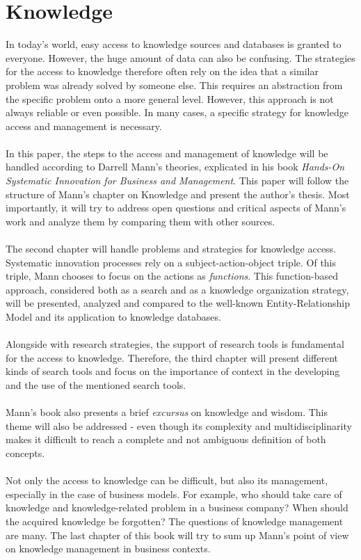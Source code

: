 \chapter{Knowledge}
In today's world, easy access to knowledge sources and databases is granted to everyone. However, the huge amount of data can also be confusing. The strategies for the access to knowledge therefore often rely on the idea that a similar problem was already solved by someone else. This requires an abstraction from the specific problem onto a more general level. However, this approach is not always reliable or even possible. In many cases, a specific strategy for knowledge access and management is necessary.\\ \\  In this paper, the steps to the access and management of knowledge will be handled according to Darrell Mann's theories, explicated in his book \textit{Hands-On Systematic Innovation for Business and Management}. \cite{darrell2004hands}
This paper will follow the structure of Mann's chapter on Knowledge and present the author's thesis. Most importantly, it will try to address open questions and critical aspects of Mann's work and analyze them by comparing them with other sources.\\
\\
The second chapter will handle problems and strategies for knowledge access. Systematic innovation processes rely on a subject-action-object triple. Of this triple, Mann chooses to focus on the actions as \textit{functions}. This function-based approach, considered both as a search and as a knowledge organization strategy, will be presented, analyzed and compared to the well-known Entity-Relationship Model and its application to knowledge databases.\\
\\
Alongside with research strategies, the support of research tools is fundamental for the access to knowledge. Therefore, the third chapter will present different kinds of search tools and focus on the importance of context in the developing and the use of the mentioned search tools.\\
\\
Mann's book also presents a brief \textit{excursus} on knowledge and wisdom. This theme will also be addressed - even though its complexity and multidisciplinarity makes it difficult to reach a complete and not ambiguous definition of both concepts. 
\\ \\ Not only the access to knowledge can be difficult, but also its management, especially in the case of business models. For example, who should take care of knowledge and knowledge-related problem in a business company? When should the acquired knowledge be forgotten? The questions of knowledge management are many. The last chapter of this book will try to sum up Mann's point of view on knowledge management in business contexts.
